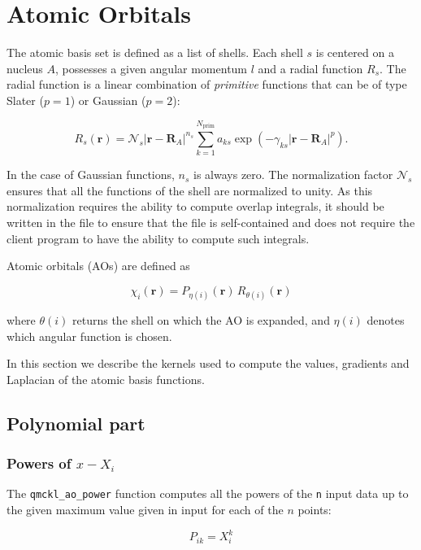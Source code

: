 \section*{Atomic Orbitals}

The atomic basis set is defined as a list of shells. Each shell \(s\) is
centered on a nucleus \(A\), possesses a given angular momentum \(l\) and a
radial function \(R_s\). The radial function is a linear combination of
\emph{primitive} functions that can be of type Slater (\(p=1\))  or
Gaussian (\(p=2\)):

\[
  R_s(\mathbf{r}) = \mathcal{N}_s |\mathbf{r}-\mathbf{R}_A|^{n_s}
  \sum_{k=1}^{N_{\text{prim}}} a_{ks}
 \exp \left( - \gamma_{ks} | \mathbf{r}-\mathbf{R}_A | ^p \right). 
\]

In the case of Gaussian functions, \(n_s\) is always zero.
The normalization factor \(\mathcal{N}_s\) ensures that all the functions
of the shell are normalized to unity. As this normalization requires
the ability to compute overlap integrals, it should be written in the
file to ensure that the file is self-contained and does not require
the client program to have the ability to compute such integrals.

Atomic orbitals (AOs) are defined as

\[
\chi_i (\mathbf{r}) = P_{\eta(i)}(\mathbf{r})\, R_{\theta(i)} (\mathbf{r})
\]

where \(\theta(i)\) returns the shell on which the AO is expanded,
and \(\eta(i)\) denotes which angular function is chosen.

In this section we describe the kernels used to compute the values,
gradients and Laplacian of the atomic basis functions.

\subsection{Polynomial part}
\label{sec:org1f012e1}

\subsubsection{Powers of \(x-X_i\)}
\label{sec:orgaab9807}

The \texttt{qmckl\_ao\_power} function computes all the powers of the \texttt{n}
input data up to the given maximum value given in input for each of
the \(n\) points:

\[ P_{ik} = X_i^k \]

